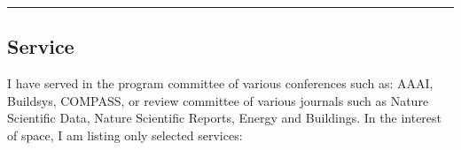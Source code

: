 \documentclass[letter,10pt]{article}
\begin{document}
\ifcvshort\else
\vspace{0.5em}
\noindent\rule{\textwidth}{0.5pt}
\vspace{-0.2em}
\fi

\subsection*{\textbf{Service}}
\vspace{-0.4em}
I have served in the program committee of various conferences such as: AAAI, Buildsys, COMPASS, or review committee of various journals such as Nature Scientific Data, Nature Scientific Reports, Energy and Buildings. In the interest of space, I am listing only selected services:



\begin{itemize}


\end{itemize}
\end{document}
